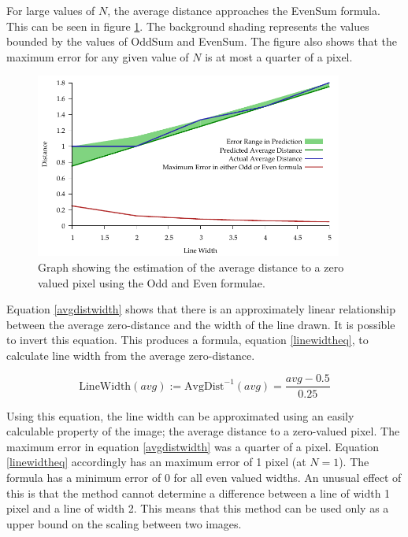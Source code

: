 \documentclass[../main.tex]{subfiles}
\begin{document}
    For large values of $N$, the average distance approaches the EvenSum formula.
    This can be seen in figure \ref{oddevenwidth}.
    The background shading represents the values bounded by the values of OddSum and EvenSum.
    The figure also shows that the maximum error for any given value of $N$ is at most a quarter of a pixel.

    \begin{figure}[H]
      \centering
      \includegraphics[width=0.9\textwidth]{graphs/oddevenwidth.pdf}
      \caption{Graph showing the estimation of the average distance to a zero valued pixel using the Odd and Even formulae.}
      \label{oddevenwidth}
    \end{figure}

    Equation \ref{avgdistwidth} shows that there is an approximately linear relationship between the average zero-distance and the width of the line drawn.
    It is possible to invert this equation.
    This produces a formula, equation \ref{linewidtheq}, to calculate line width from the average zero-distance.

    \begin{equation}
      \text{LineWidth}(avg) := \text{AvgDist}^{-1}(avg) = \frac{avg-0.5}{0.25}
      \label{linewidtheq}
    \end{equation}

    Using this equation, the line width can be approximated using an easily calculable property of the image; the average distance to a zero-valued pixel.
    The maximum error in equation \ref{avgdistwidth} was a quarter of a pixel.
    Equation \ref{linewidtheq} accordingly has an maximum error of 1 pixel (at $N=1$).
    The formula has a minimum error of 0 for all even valued widths.
    An unusual effect of this is that the method cannot determine a difference between a line of width 1 pixel and a line of width 2.
    This means that this method can be used only as a upper bound on the scaling between two images.
\end{document}
